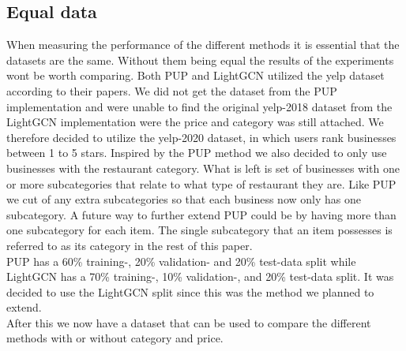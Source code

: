 \subsection{Equal data} \label{equal-data}
When measuring the performance of the different methods it is essential that the datasets are the same.
Without them being equal the results of the experiments wont be worth comparing.
Both PUP and LightGCN utilized the yelp dataset according to their papers.
We did not get the dataset from the PUP implementation and were unable to find the original yelp-2018 dataset from the LightGCN implementation were the price and category was still attached.
We therefore decided to utilize the yelp-2020 dataset, in which users rank businesses between 1 to 5 stars.
Inspired by the PUP method we also decided to only use businesses with the restaurant category.
What is left is set of businesses with one or more subcategories that relate to what type of restaurant they are.
Like PUP we cut of any extra subcategories so that each business now only has one subcategory.
A future way to further extend PUP could be by having more than one subcategory for each item.
The single subcategory that an item possesses is referred to as its category in the rest of this paper.
\\
PUP has a 60\% training-, 20\% validation- and 20\% test-data split while LightGCN has a 70\% training-, 10\% validation-, and 20\% test-data split.
It was decided to use the LightGCN split since this was the method we planned to extend.
\\
After this we now have a dataset that can be used to compare the different methods with or without category and price.

